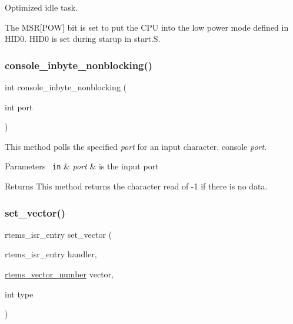 Optimized idle task.

The M\+SR\mbox{[}P\+OW\mbox{]} bit is set to put the C\+PU into the low power mode defined in H\+I\+D0. H\+I\+D0 is set during starup in start.\+S. \mbox{\label{group__RTEMSBSPsSPARCERC32_ga33017a80c39bdce884e201734ceb023d}} 
\subsubsection{\texorpdfstring{console\_inbyte\_nonblocking()}{console\_inbyte\_nonblocking()}}
{\footnotesize\ttfamily int console\+\_\+inbyte\+\_\+nonblocking (\begin{DoxyParamCaption}\item[{int}]{port }\end{DoxyParamCaption})}

This method polls the specified {\itshape port} for an input character. console {\itshape port}.


\begin{DoxyParams}[1]{Parameters}
\mbox{\texttt{ in}}  & {\em port} & is the input port\\
\hline
\end{DoxyParams}
\begin{DoxyReturn}{Returns}
This method returns the character read of -\/1 if there is no data. 
\end{DoxyReturn}
\mbox{\label{group__RTEMSBSPsSPARCERC32_gab3388042c56b34c40be81fd5f028d97e}} 
\subsubsection{\texorpdfstring{set\_vector()}{set\_vector()}}
{\footnotesize\ttfamily rtems\+\_\+isr\+\_\+entry set\+\_\+vector (\begin{DoxyParamCaption}\item[{rtems\+\_\+isr\+\_\+entry}]{handler,  }\item[{\mbox{\hyperlink{group__ClassicINTR_ga3e434c197d99f128e78cae4d9358bd8b}{rtems\+\_\+vector\+\_\+number}}}]{vector,  }\item[{int}]{type }\end{DoxyParamCaption})}




